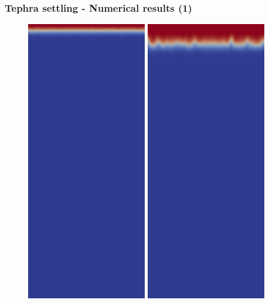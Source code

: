 \begin{frame}
  \frametitle{Tephra settling - Numerical results (1)}
\begin{figure}[H]
        \centering
                \includegraphics[scale=0.2]{tephra_settling/tephra_fine_1.png}\hspace{0.1cm}
                \includegraphics[scale=0.2]{tephra_settling/tephra_fine_2.png}\hspace{0.1cm}

\end{figure}
\end{frame}
